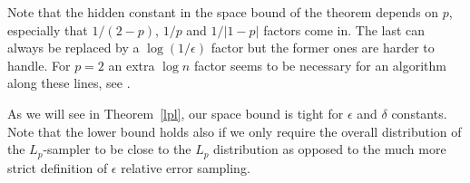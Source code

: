 Note that the hidden constant in the space bound of the theorem depends on
$p$, especially that $1/(2-p)$, $1/p$ and $1/|1-p|$ factors come in. The last
can
always be replaced by a $\log(1/\epsilon)$ factor but the former ones are
harder to handle. For $p=2$ an extra $\log n$ factor seems to be necessary for
an algorithm along these lines, see \cite{AndoniKO2010}.

As we will see in Theorem~\ref{lpl}, our space bound is tight for $\epsilon$
and $\delta$ constants. Note that the lower bound holds also if we only
require the overall distribution of the $L_p$-sampler to be close to the $L_p$
distribution as opposed to the much more strict definition of $\epsilon$
relative error sampling.
